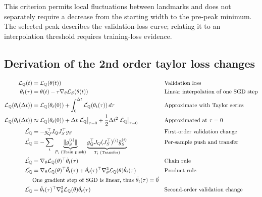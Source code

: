 \documentclass[10pt]{article} %
\newcommand{\genloss}{\mathcal{L}_{\sQ}}
\begin{document}
This criterion permits local fluctuations between landmarks and does not
separately require a decrease from the starting width to the pre-peak
minimum. The selected peak describes the validation-loss curve; relating
it to an interpolation threshold requires training-loss evidence.

\subsection{Derivation of the 2nd order taylor loss changes}
\label{ap:taylor-derivation}

\begin{align}
    \genloss(t)
    &= \genloss(\theta(t))
    && \text{Validation loss} \\
    \theta_t(\tau)
    &= \theta(t) - \tau \nabla_\theta \mathcal{L}_S(\theta(t))
    && \text{Linear interpolation of one SGD step} \\
    \genloss(\theta_t(\Delta t))
    &= \genloss(\theta_t(0))
    + \int_0^{\Delta t}
    \dot{\genloss}(\theta_t(\tau)) \, d\tau
    && \text{Approximate with Taylor series} \\
    \genloss(\theta_t(\Delta t))
    &\approx \genloss(\theta_t(0))
    + \Delta t
    \left.\dot{\genloss}\right|_{\tau=0}
    + \frac{1}{2} \Delta t^2
    \left.\ddot{\genloss}\right|_{\tau=0}
    && \text{Approximated at $\tau=0$} \\
    \dot{\genloss}
    &= -g^\top_Q J_Q J_S^\top g_S
    && \text{First-order validation change} \\
    \dot{\genloss}
    &= -\sum_i
    \underbrace{\lVert g_S^{(i)} \rVert}_{P_i\;\text{(Train push)}}
    \underbrace{
        g_Q^\top J_Q
        (J_S^\top)^{(i)}
        \hat{g}_S^{(i)}
    }_{T_i\;\text{(Transfer)}}
    && \text{Per-sample push and transfer} \\
    \dot{\genloss}
    &= \nabla_\theta \genloss(\theta)^\top
    \dot{\theta}_t(\tau)
    && \text{Chain rule} \\
    \ddot{\genloss}
    &= \nabla_\theta \genloss(\theta)^\top
    \ddot{\theta}_t(\tau)
    + \dot{\theta}_t(\tau)^\top
    \nabla_\theta^2 \genloss(\theta)
    \dot{\theta}_t(\tau)
    && \text{Product rule} \\
    & \text{One gradient step of SGD is linear, thus
    $\ddot{\theta}_t(\tau) = \vec{0}$} \\
    \ddot{\genloss}
    &= \dot{\theta}_t(\tau)^\top
    \nabla_\theta^2 \genloss(\theta)
    \dot{\theta}_t(\tau)
    && \text{Second-order validation change} \\

\end{align}
\end{document}
